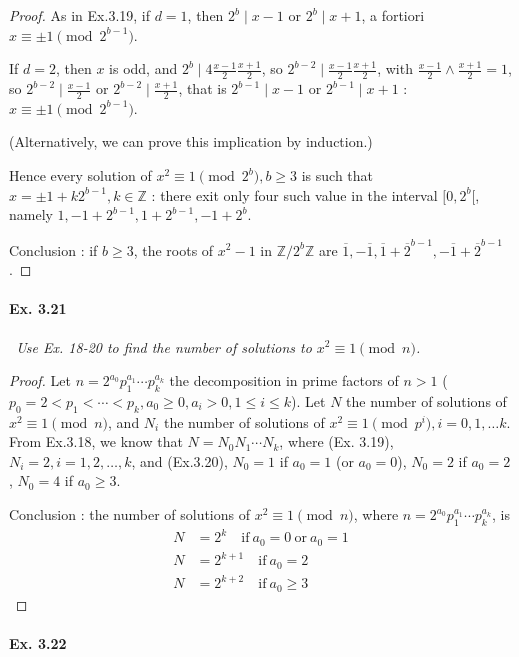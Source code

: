 \documentclass[11pt,a4paper]{article}
\newcommand{\Z}{\mathbb{Z}}
\begin{document}
{\begin{proof}
As in Ex.3.19, if $d=1$, then $2^b \mid x-1$ or $2^b \mid x+1$, a fortiori $x \equiv \pm 1 \pmod{2^{b-1}}$.

If $d=2$, then $x$ is odd, and $2^b \mid 4\frac{x-1}{2}\frac{x+1}{2}$,  so $2^{b-2} \mid \frac{x-1}{2}\frac{x+1}{2}$, with $\frac{x-1}{2} \wedge \frac{x+1}{2}=1$, so $2^{b-2} \mid \frac{x-1}{2}$ or $2^{b-2} \mid \frac{x+1}{2}$, that is $2^{b-1} \mid x-1$ or $2^{b-1} \mid x+1$ : $x \equiv \pm 1 \pmod{2^{b-1}}$.

(Alternatively, we can prove this implication by induction.)

Hence every solution of $x^2 \equiv 1\pmod{2^b}, b\geq 3$ is such that $x = \pm1+k2^{b-1}, k \in \Z$ : there exit only four such value in the interval $[0,2^b[$, namely $1,-1+2^{b-1},1+2^{b-1},-1+2^b$.

Conclusion : if $b\geq 3$, the roots of $x^2-1$ in $\Z/2^b\Z$ are $ \overline{1}, -\overline{1}, \overline{1} + \overline{2}^{b-1},-\overline{1} + \overline{2}^{b-1}$.
\end{proof}

\paragraph{Ex. 3.21}

{\it \
Use Ex. 18-20 to find the number of solutions to $x^2 \equiv 1 \pmod n$.
}

\begin{proof}
Let $n = 2^{a_0}p_1^{a_1}\cdots p_k^{a_k}$ the decomposition in prime factors of $n>1$ ($p_0=2<p_1<\cdots<p_k, a_0\geq 0, a_i>0, 1\leq i \leq k$). Let $N$ the number of solutions of $x^2 \equiv 1 \pmod n$, and $N_i$ the number of solutions of $x^2 \equiv 1 \pmod {p^i}, i = 0,1,\ldots k$. From Ex.3.18, we know that $N = N_0N_1\cdots N_k$, where (Ex. 3.19), $N_i = 2, i=1,2,\ldots,k$, and (Ex.3.20), $N_0=1$ if $a_0=1$ (or $a_0 = 0$), $N_0 = 2$ if $a_0 = 2$, $N_0=4$ if $a_0\geq 3$.

Conclusion : the number of solutions of $x^2 \equiv 1 \pmod n$,  where $n = 2^{a_0}p_1^{a_1}\cdots p_k^{a_k}$, is
\begin{align*}
N &= 2^k\quad \mathrm{if}\ a_0=0\ \mathrm{or}\ a_0 = 1\\
N &= 2^{k+1} \quad \mathrm{if}\ a_0=2\\
N &= 2^{k+2} \quad \mathrm{if}\ a_0\geq 3
\end{align*}
\end{proof}

\paragraph{Ex. 3.22}

}
\end{document}
